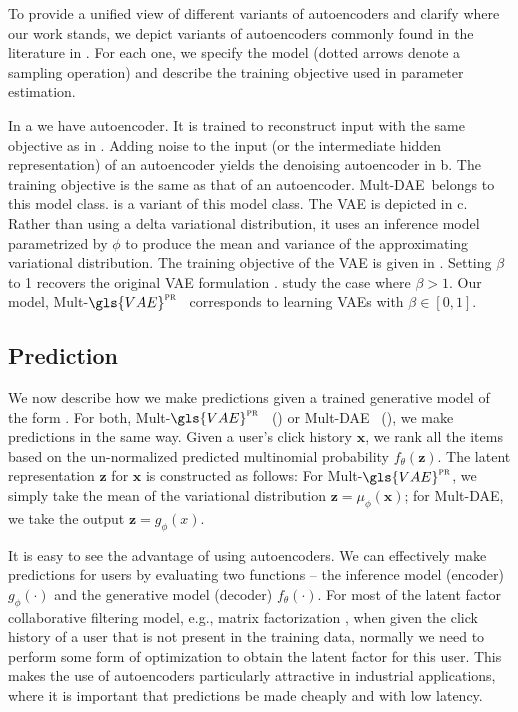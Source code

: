 \documentclass[sigconf]{acmart}
\newcommand{\mathbold}[1]{\ensuremath{\boldsymbol{\mathbf{#1}}}}
\newcommand{\mbx}{\mathbold{x}}
\newcommand{\mbz}{\mathbold{z}}
\newcommand{\mvae}{{\small Mult-}$\gls{VAE}^{\text{\sc pr}}$}
\newcommand{\mdae}{{\small Mult-}\gls{DAE}}
\begin{document}
 To provide a unified view of different variants of autoencoders and clarify where our work stands,
we depict variants of autoencoders commonly found in the literature in . 
For each one, we specify the model (dotted arrows denote a sampling operation) and describe the training objective used in parameter estimation.

In a we have autoencoder. It is trained to reconstruct input with the same objective as in . 
Adding noise to the input (or the intermediate hidden representation) 
of an autoencoder yields the denoising autoencoder in b. The training objective is the same as that of an autoencoder. 
\mdae~belongs to this model class.  \citep{wu2016collaborative} is a variant of this model class. 
The \gls{VAE} is depicted in c. Rather than using a delta variational distribution, it uses an inference model parametrized by 
$\phi$ to produce the mean and variance of the approximating variational distribution. 
The training objective of the \gls{VAE} is given in . 
Setting $\beta$ to 1 recovers the original \gls{VAE} formulation \citep{kingma2013auto,rezende2014stochastic}. 
\citet{higgins2017beta} study the case where $\beta > 1$. Our model, \mvae~ corresponds to learning \glspl{VAE} with $\beta\in[0,1]$.

\subsection{Prediction}\label{sec:pred}

We now describe how we make predictions given a trained generative model of the form 
. For both, \mvae~ () or \mdae~ (), we make predictions in the same way. 
Given a user's click history $\mbx$, we rank all the items based on the un-normalized predicted multinomial probability $f_\theta(\mbz)$. 
The latent representation $\mbz$ for $\mbx$ is constructed as follows: 
For \mvae, we simply take the mean of the variational distribution $\mbz = \mu_\phi(\mbx)$; for \mdae, we take the output $\mbz = g_\phi(x)$. 

It is easy to see the advantage of using autoencoders. 
We can effectively make predictions for users by evaluating two functions -- the inference model (encoder) $g_\phi(\cdot)$ and the generative model (decoder) $f_\theta(\cdot)$. 
For most of the latent factor collaborative filtering model, e.g., matrix factorization 
\citep{hu2008collaborative,gopalan2015scalable}, when given the click history of a user that is not 
present in the training data, normally we need to perform some form of optimization to obtain the latent factor 
for this user. 
This makes the use of autoencoders particularly attractive in industrial applications,
where it is important that predictions be made cheaply and with low latency.
 
\end{document}
